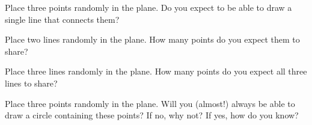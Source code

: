 \begin{question} 
Place three points randomly in the plane. Do you expect to be able to
draw a single line that connects them?
\end{question}
\QM

\begin{question} 
Place two lines randomly in the plane. How many points do you expect
them to share?
\end{question}
\QM


\begin{question} 
Place three lines randomly in the plane. How many points do you expect
all three lines to share?
\end{question}
\QM


\begin{question} 
Place three points randomly in the plane. Will you (almost!) always be
able to draw a circle containing these points? If no, why not? If yes,
how do you know?
\end{question}
\QM


%
%
%
%
%



